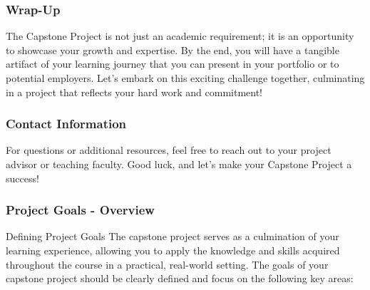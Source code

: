 \documentclass[aspectratio=169]{beamer}
\begin{document}
\begin{frame}[fragile]
    \frametitle{Wrap-Up}
    The Capstone Project is not just an academic requirement; it is an opportunity to showcase your growth and expertise. By the end, you will have a tangible artifact of your learning journey that you can present in your portfolio or to potential employers. 
    \newline
    Let’s embark on this exciting challenge together, culminating in a project that reflects your hard work and commitment!
\end{frame}

\begin{frame}[fragile]
    \frametitle{Contact Information}
    For questions or additional resources, feel free to reach out to your project advisor or teaching faculty. Good luck, and let’s make your Capstone Project a success!
\end{frame}

\begin{frame}[fragile]
    \frametitle{Project Goals - Overview}
    \begin{block}{Defining Project Goals}
        The capstone project serves as a culmination of your learning experience, allowing you to apply the knowledge and skills acquired throughout the course in a practical, real-world setting. The goals of your capstone project should be clearly defined and focus on the following key areas:
    \end{block}
\end{frame}
\end{document}

